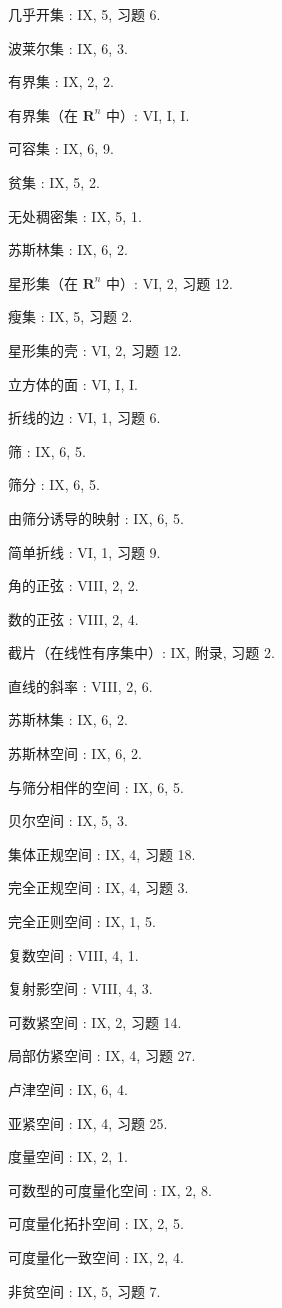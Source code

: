 几乎开集 : IX, 5, 习题 6.

波莱尔集 : IX, 6, 3.

有界集 : IX, 2, 2.

有界集（在 \(\mathbf{R}^n\) 中）: VI, I, I.

可容集 : IX, 6, 9.

贫集 : IX, 5, 2.

无处稠密集 : IX, 5, 1.

苏斯林集 : IX, 6, 2.

星形集（在 \(\mathbf{R}^n\) 中）: VI, 2, 习题 12.

瘦集 : IX, 5, 习题 2.

星形集的壳 : VI, 2, 习题 12.

立方体的面 : VI, I, I.

折线的边 : VI, 1, 习题 6.

筛 : IX, 6, 5.

筛分 : IX, 6, 5.

由筛分诱导的映射 : IX, 6, 5.

简单折线 : VI, 1, 习题 9.

角的正弦 : VIII, 2, 2.

数的正弦 : VIII, 2, 4.

截片（在线性有序集中）: IX, 附录, 习题 2.

直线的斜率 : VIII, 2, 6.

苏斯林集 : IX, 6, 2.

苏斯林空间 : IX, 6, 2.

与筛分相伴的空间 : IX, 6, 5.

贝尔空间 : IX, 5, 3.

集体正规空间 : IX, 4, 习题 18.

完全正规空间 : IX, 4, 习题 3.

完全正则空间 : IX, 1, 5.

复数空间 : VIII, 4, 1.

复射影空间 : VIII, 4, 3.

可数紧空间 : IX, 2, 习题 14.

局部仿紧空间 : IX, 4, 习题 27.

卢津空间 : IX, 6, 4.

亚紧空间 : IX, 4, 习题 25.

度量空间 : IX, 2, 1.

可数型的可度量化空间 : IX, 2, 8.

可度量化拓扑空间 : IX, 2, 5.

可度量化一致空间 : IX, 2, 4.

非贫空间 : IX, 5, 习题 7.

